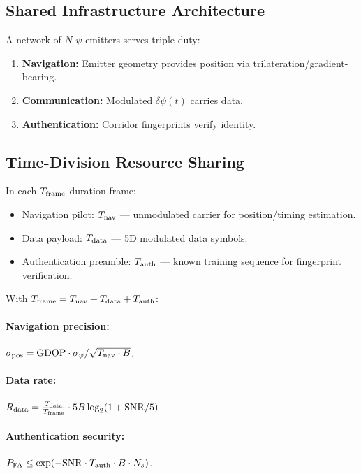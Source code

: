 \documentclass[twocolumn,superscriptaddress,prd,nofootinbib]{revtex4-2}
\newcommand{\SNR}{\mathrm{SNR}}
\newcommand{\GDOP}{\mathrm{GDOP}}
\begin{document}
\subsection{Shared Infrastructure Architecture}

A network of $N$ $\psi$-emitters serves triple duty:
\begin{enumerate}
\item \textbf{Navigation:} Emitter geometry provides position via
trilateration/gradient-bearing.
\item \textbf{Communication:} Modulated $\delta\psi(t)$ carries data.
\item \textbf{Authentication:} Corridor fingerprints verify identity.
\end{enumerate}

\subsection{Time-Division Resource Sharing}

In each $T_{\rm frame}$-duration frame:
\begin{itemize}
\item Navigation pilot: $T_{\rm nav}$ --- unmodulated carrier for
position/timing estimation.
\item Data payload: $T_{\rm data}$ --- 5D modulated data symbols.
\item Authentication preamble: $T_{\rm auth}$ --- known training
sequence for fingerprint verification.
\end{itemize}
With $T_{\rm frame} = T_{\rm nav} + T_{\rm data} + T_{\rm auth}$:

\paragraph{Navigation precision:}
$\sigma_{\rm pos} = \GDOP \cdot \sigma_\psi/\sqrt{T_{\rm nav}\cdot B}$.

\paragraph{Data rate:}
$R_{\rm data} = \frac{T_{\rm data}}{T_{\rm frame}}\cdot 5B\log_2(1 + \SNR/5)$.

\paragraph{Authentication security:}
$P_{\rm FA} \leq \exp(-\SNR\cdot T_{\rm auth}\cdot B\cdot N_s)$.
\end{document}
